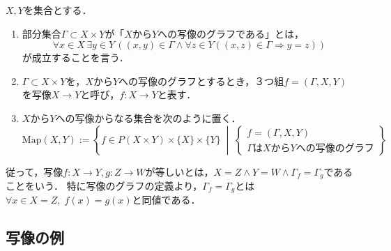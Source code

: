 \documentclass[uplatex,dvipdfmx]{jsreport}
\begin{document}
\begin{definition}[mapping]$X,Y$を集合とする．
    \begin{enumerate}
        \item 部分集合$\Gamma\subset X\times Y$が「$X$から$Y$への写像のグラフである」とは，\[\forall x\in X\, \exists y\in Y \, ((x,y)\in\Gamma\wedge \forall z\in Y((x,z)\in\Gamma\Rightarrow y=z))\]が成立することを言う．
        \item $\Gamma\subset X\times Y$を，$X$から$Y$への写像のグラフとするとき，３つ組$f=(\Gamma,X,Y)$を写像$X\to Y$と呼び，$f:X\to Y$と表す．
        \item $X$から$Y$への写像からなる集合を次のように置く．
        \[\mathrm{Map}(X,Y):=\left\{ f\in P(X\times Y)\times \{ X\}\times\{ Y\} \;\middle|\; \begin{cases}
            f=(\Gamma,X,Y)\\
            \Gamma はXからYへの写像のグラフ
        \end{cases}\right\}\]
    \end{enumerate}
\end{definition}
従って，写像$f:X\to Y,g:Z\to W$が等しいとは，$X=Z\land Y=W\land \Gamma_f=\Gamma_g$であることをいう．
特に写像のグラフの定義より，$\Gamma_f=\Gamma_g$とは$\forall x\in X=Z,\;f(x)=g(x)$と同値である．

\subsection{写像の例}
\end{document}
